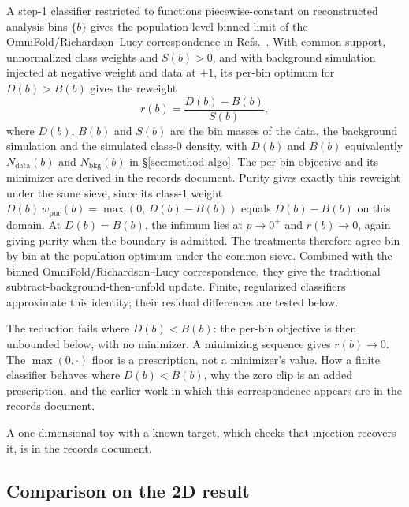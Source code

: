 A step-1 classifier restricted to functions piecewise-constant on reconstructed analysis bins $\{b\}$ gives the population-level binned limit of the OmniFold/Richardson--Lucy correspondence in Refs.~\cite{Andreassen:2019cjw,Andreassen:2021zzk}. With common support, unnormalized class weights and $S(b)>0$, and with background simulation injected at negative weight and data at $+1$, its per-bin optimum for $D(b)>B(b)$ gives the reweight
\begin{equation}
  \label{eq:negweight-rb}
  r(b) = \frac{D(b)-B(b)}{S(b)},
\end{equation}
where $D(b)$, $B(b)$ and $S(b)$ are the bin masses of the data, the background simulation and the simulated class-0 density, with $D(b)$ and $B(b)$ equivalently $N_{\mathrm{data}}(b)$ and $N_{\mathrm{bkg}}(b)$ in \S\ref{sec:method-algo}. The per-bin objective and its minimizer are derived in the records document. Purity gives exactly this reweight under the same sieve, since its class-1 weight $D(b)\,w_{\mathrm{pur}}(b)=\max(0,\,D(b)-B(b))$ equals $D(b)-B(b)$ on this domain. At $D(b)=B(b)$, the infimum lies at $p\to0^+$ and $r(b)\to0$, again giving purity when the boundary is admitted. The treatments therefore agree bin by bin at the population optimum under the common sieve. Combined with the binned OmniFold/Richardson--Lucy correspondence, they give the traditional subtract-background-then-unfold update. Finite, regularized classifiers approximate this identity; their residual differences are tested below.

The reduction fails where $D(b)<B(b)$: the per-bin objective is then unbounded below, with no minimizer. A minimizing sequence gives $r(b)\to0$. The $\max(0,\cdot)$ floor is a prescription, not a minimizer's value. How a finite classifier behaves where $D(b)<B(b)$, why the zero clip is an added prescription, and the earlier work in which this correspondence appears are in the records document.




A one-dimensional toy with a known target, which checks that injection recovers it, is in the records document.

\subsection{Comparison on the 2D result}
\label{sec:negweight-2d}


